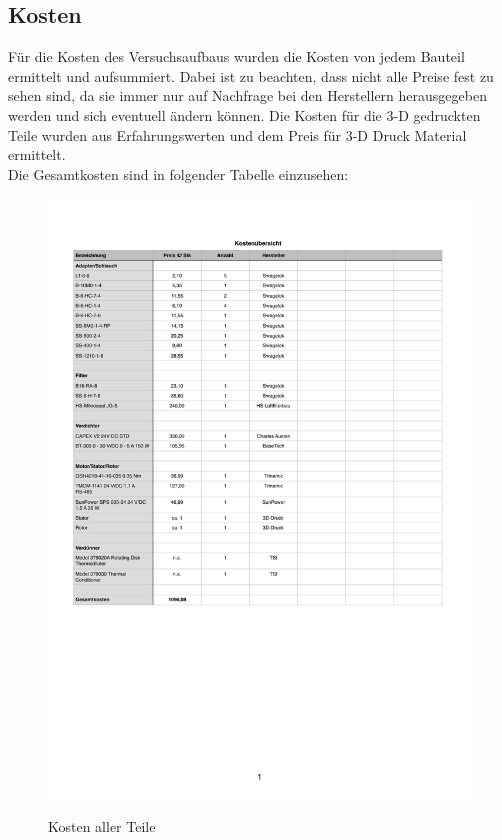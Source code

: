 \subsection{Kosten}
F\"{u}r die Kosten des Versuchsaufbaus wurden die Kosten von jedem Bauteil ermittelt und aufsummiert. Dabei ist zu beachten, dass nicht alle Preise fest zu sehen sind, da sie immer nur auf Nachfrage bei den Herstellern herausgegeben werden und sich eventuell \"{a}ndern k\"{o}nnen. Die Kosten f\"{u}r die 3-D gedruckten Teile wurden aus Erfahrungswerten und dem Preis f\"{u}r 3-D Druck Material ermittelt.\\
Die Gesamtkosten sind in folgender Tabelle einzusehen:
\begin{figure}[H]
        \myfloatalign
        {\includegraphics[width=.9\linewidth]{gfx/construction/kosten.pdf}} \quad
        \caption[Kosten aller Teile]
        {Kosten aller Teile}
        \label{fig:kosten}
\end{figure}

